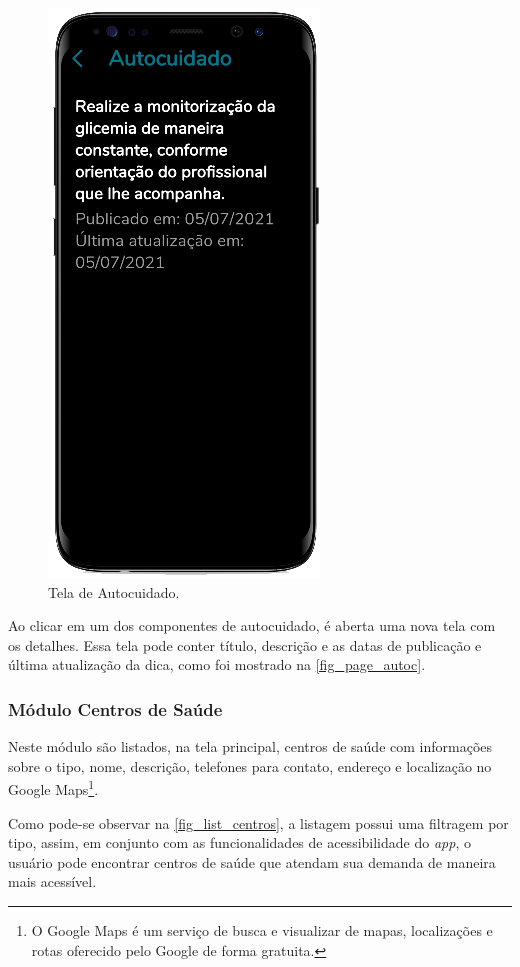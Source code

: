 \begin{figure}[htb]
\begin{minipage}{0.45\textwidth}
        \caption{Tela de Autocuidado.}\label{fig_page_autoc}
        \includegraphics[scale=0.72]{Imagens/desenvolvimento/app/page_autoc.png}
    \end{minipage}
\end{figure}

Ao clicar em um dos componentes de autocuidado, é aberta uma nova tela com os detalhes. Essa tela pode
conter título, descrição e as datas de publicação e última atualização da dica, como foi mostrado na
\autoref{fig_page_autoc}.

\subsubsection{Módulo Centros de Saúde}

Neste módulo são listados, na tela principal, centros de saúde com informações sobre o tipo, nome, descrição,
telefones para contato, endereço e localização no Google Maps\footnote{O Google Maps é um serviço de busca e
    visualizar de mapas, localizações e rotas oferecido pelo Google de forma gratuita.}.

Como pode-se observar na \autoref{fig_list_centros}, a listagem possui uma filtragem por tipo, assim,
em conjunto com as funcionalidades de acessibilidade do \emph{app}, o usuário pode encontrar
centros de saúde que atendam sua demanda de maneira mais acessível.

